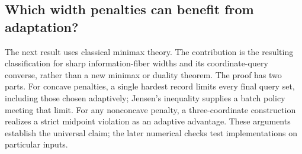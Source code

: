 \documentclass[12pt]{article}
\begin{document}
\FloatBarrier
\subsection{Which width penalties can benefit from adaptation?}
\label{sec:risk_classification}
The next result uses classical minimax theory. The contribution is the
resulting classification for sharp information-fiber widths and its
coordinate-query converse, rather than a new minimax or duality theorem.
The proof has two parts. For concave penalties, a single hardest record
limits every final query set, including those chosen adaptively; Jensen's
inequality supplies a batch policy meeting that limit. For any nonconcave
penalty, a three-coordinate construction realizes a strict midpoint
violation as an adaptive advantage. These arguments establish the universal
claim; the later numerical checks test implementations on particular inputs.
\end{document}
